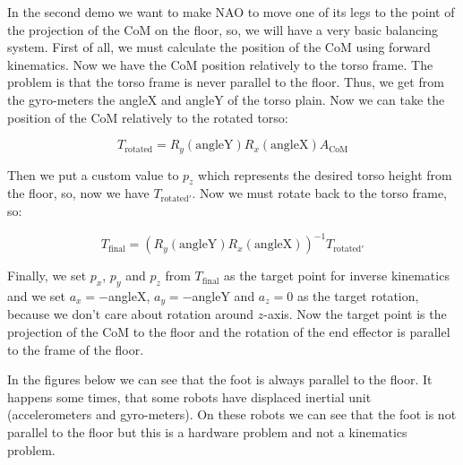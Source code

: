 In the second demo we want to make NAO to move one of its legs to the point of the projection of the CoM on the floor, so, we will have a very basic balancing system. First of all, we must calculate the position of the CoM using forward kinematics. Now we have the CoM position relatively to the torso frame. The problem is that the torso frame is never parallel to the floor. Thus, we get from the gyro-meters the angleX and angleY of the torso plain. Now we can take the position of the CoM relatively to the rotated torso:

\[
	T_{\text{rotated}} = R_y(\text{angleY})R_x(\text{angleX})A_{\text{CoM}}
\]

Then we put a custom value to $p_z$ which represents the desired torso height from the floor, so, now we have $T_{\text{rotated}'}$. Now we must rotate back to the torso frame, so:

\[
	T_{\text{final}} = \left(R_y(\text{angleY})R_x(\text{angleX})\right)^{-1}T_{\text{rotated}'}
\]

Finally, we set  $p_x$, $p_y$ and $p_z$ from $T_{\text{final}}$ as the target point for inverse kinematics and we set $a_x = -$angleX, $a_y = -$angleY and $a_z = 0$ as the target rotation, because we don't care about rotation around $z$-axis. Now the target point is the projection of the CoM to the floor and the rotation of the end effector is parallel to the frame of the floor.

In the figures below we can see that the foot is always parallel to the floor. It happens some times, that some robots have displaced inertial unit (accelerometers and gyro-meters). On these robots we can see that the foot is not parallel to the floor but this is a hardware problem and not a kinematics problem.

